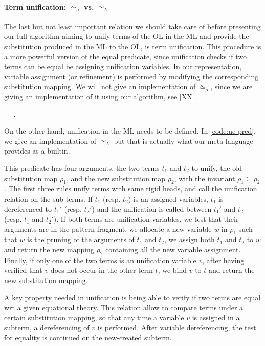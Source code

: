 \documentclass[sigconf,natbib=false]{acmart}
\newcommand{\UnifRel}{\ensuremath{\simeq}}
\newcommand{\Uo}{\ensuremath{\UnifRel_o}\xspace}
\newcommand{\Ue}{\ensuremath{\UnifRel_\lambda}\xspace}
\begin{document}
\paragraph{Term unification: \Uo vs. \Ue} 
The last but not least important relation we should take care of before
presenting our full algorithm aiming to unify terms of the OL in the ML and
provide the substitution produced in the ML to the OL, is term unification. This
procedure is a more powerful version of the equal predicate, since unification
checks if two terms can be equal be assigning unification variables. In our
representation, variable assignment (or refinement) is performed by modifying
the corresponding substitution mapping. We will not give an implementation of
\Uo, since we are giving an implementation of it using
our algorithm, see \cref{XX}.

\begin{elpicode}
~ \PYG{n+nf}{(\Ue)} ~.
\end{elpicode}

On the other hand, unification in the ML needs to be defined. In
\cref{code:ue-pred}, we give an implementation of \Ue but
that is actually what our meta language provides as a builtin.

This predicate has four
arguments, the two terms $t_1$ and $t_2$ to unify, the old substitution map
$\rho_1$, and the new substitution map $\rho_2$, with the invariant $\rho_1
\subseteq \rho_2$. The first three rules unify terms with same rigid heads, and
call the unification relation on the sub-terms. If $t_1$ (resp. $t_2$) is an
assigned variables, $t_1$ is dereferenced to $t_1'$ (resp. $t_2'$) and the
unification is called between $t_1'$ and $t_2$ (resp. $t_1$ and $t_2'$). If both
terms are unification variables, we test that their arguments are in the pattern
fragment, we allocate a new variable $w$ in $\rho_1$ such that $w$ is the
pruning of the arguments of $t_1$ and $t_2$, we assign both $t_1$ and $t_2$ to
$w$ and return the new mapping $\rho_2$ containing all the new variable
assignment. Finally, if only one of the two terms is an unification variable
$v$, after having verified that $v$ does not occur in the other term $t$, we
bind $v$ to $t$ and return the new substitution mapping.

\old

A key property needed in unification is being able to verify if two terms are
equal wrt a given equational theory. This relation allow to compare terms under
a certain substitution mapping, so that any time a variable $v$ is assigned in a
subterm, a dereferencing of $v$ is performed. After variable dereferencing, the
test for equality is continued on the new-created subterm.
\end{document}
